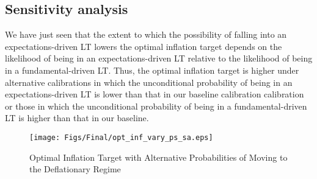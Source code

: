 \documentclass[11pt]{article}
\begin{document}
	\subsection{Sensitivity analysis}
	
	We have just seen that the extent to which the possibility of falling into an expectations-driven LT lowers the optimal inflation target depends on the likelihood of being in an expectations-driven LT relative to the likelihood of being in a fundamental-driven LT. Thus, the optimal inflation target is higher under alternative calibrations in which the unconditional probability of being in an expectations-driven LT is lower than that in our baseline calibration calibration or those in which the unconditional probability of being in a fundamental-driven LT is higher than that in our baseline. 
	
	
	\begin{figure}[!h]
		\begin{center}
			\caption{Optimal Inflation Target with Alternative Probabilities of Moving to the Deflationary Regime\label{fig:OptimalPiTarg_SA}}
			\texttt{[image: Figs/Final/opt\_inf\_vary\_ps\_sa.eps]}\\
		\end{center}
	\end{figure}
	
\end{document}
